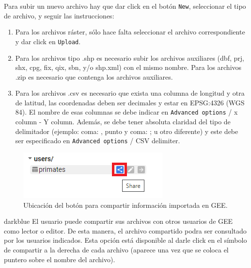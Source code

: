 \documentclass[
  12pt,
  letterpaper,
  twoside]{book}
\providecommand{\tightlist}{%
  \setlength{\itemsep}{0pt}\setlength{\parskip}{0pt}}
\begin{document}
Para subir un nuevo archivo hay que dar click en el botón \texttt{New}, seleccionar el tipo de archivo, y seguir las instrucciones:

\begin{enumerate}
\def\labelenumi{\arabic{enumi}.}
\tightlist
\item
  Para los archivos ráster, sólo hace falta seleccionar el archivo correspondiente y dar click en \texttt{Upload}.
\item
  Para los archivos tipo .shp es necesario subir los archivos auxiliares (dbf, prj, shx, cpg, fix, qix, sbn, y/o shp.xml) con el mismo nombre. Para los archivos .zip es necesario que contenga los archivos auxiliares.
\item
  Para los archivos .csv es necesario que exista una columna de longitud y otra de latitud, las coordenadas deben ser decimales y estar en EPSG:4326 (WGS 84). El nombre de esas columnas se debe indicar en \texttt{Advanced\ options} / x column - Y column. Además, se debe tener absoluta claridad del tipo de delimitador (ejemplo: coma: , punto y coma: ; u otro diferente) y este debe ser especificado en \texttt{Advanced\ options} / CSV delimiter.
\end{enumerate}

\begin{figure}

{\centering \includegraphics[width=0.3\linewidth]{Img/shareAssets} 

}

\caption{Ubicación del botón para compartir información importada en GEE.}\label{fig:unnamed-chunk-170}
\end{figure}

\begin{bluebox2}

\begin{awesomeblock}{5pt}{\faLightbulb}{darkblue}
El usuario puede compartir sus archivos con otros usuarios de GEE como lector o editor. De esta manera, el archivo compartido podra ser consultado por los usuarios indicados. Esta opción está disponible al darle click en el símbolo de compartir a la derecha de cada archivo (aparece una vez que se coloca el puntero sobre el nombre del archivo).

\end{awesomeblock}

\end{bluebox2}
\end{document}
